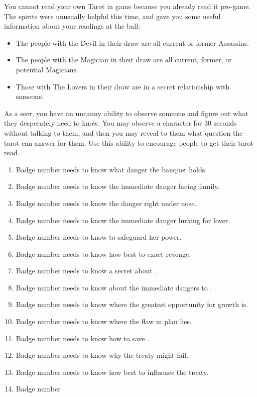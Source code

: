\documentclass[green]{NeptuneBall}
\begin{document}
You cannot read your own Tarot in game because you already read it pre-game. The spirits were unusually helpful this time, and gave you some useful information about your readings at the ball:

\begin{itemize}
\item The people with the Devil in their draw are all current or former Assassins.
\item The people with the Magician in their draw are all current, former, or potential Magicians.
\item Those with The Lovers in their draw are in a secret relationship with someone.
\end{itemize}

\newpage
As a seer, you have an uncanny ability to observe someone and figure out what they desperately need to know.  You may observe a character for 30 seconds without talking to them, and then you may reveal to them what question the tarot can answer for them. Use this ability to encourage people to get their tarot read.

\begin{enumerate}
	\item Badge number \cPlant{\MYnumber} needs to know what danger the banquet holds.
	\item Badge number \cKing{\MYnumber} needs to know the immediate danger facing \cKing{\their} family.
	\item Badge number \cQueen{\MYnumber} needs to know the danger right under \cQueen{\their} nose.
	\item Badge number \cGeneral{\MYnumber} needs to know the immediate danger lurking for \cGeneral{\their} lover.
	\item Badge number \cWitch{\MYnumber} needs to know to safeguard her power.
	\item Badge number \cPriest{\MYnumber} needs to know how best to exact revenge.
	\item Badge number \cPrincess{\MYnumber} needs to know a secret about \cPrincess{\their} \cAthena{\parent}.
	\item Badge number \cAriel{\MYnumber} needs to know about the immediate dangers to \pAtlantis{}.
	\item Badge number \cWillow{\MYnumber} needs to know where the greatest opportunity for growth is.
	\item Badge number \cManta{\MYnumber} needs to know where the flaw in \cManta{\their} plan lies.
	\item Badge number \cBodyguard{\MYnumber} needs to know how to save \pPacifica{}.
	\item Badge number \cPrince{\MYnumber} needs to know why the treaty might fail.
	\item Badge number \cSpy{\MYnumber} needs to know how best to influence the treaty.
	\item Badge number \cDiplomat{\MYnumber} 
\end{enumerate}
\end{document}
